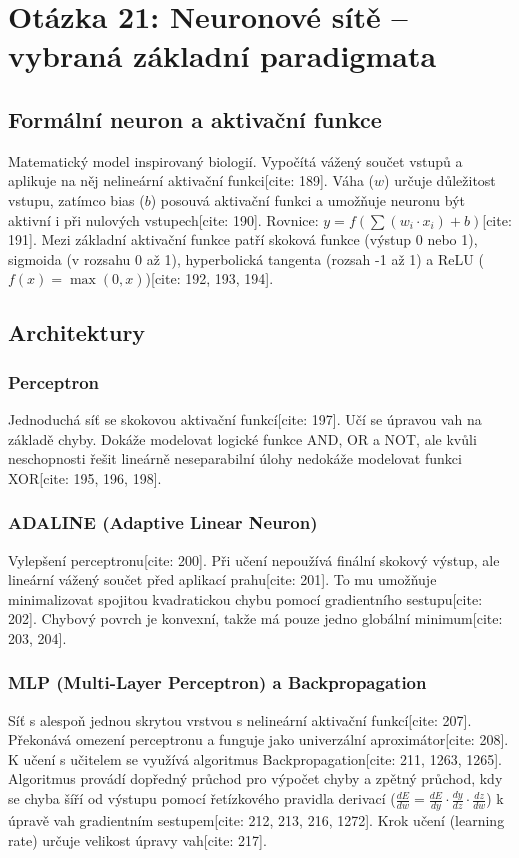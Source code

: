 \documentclass{article}
\begin{document}
\newpage

\section{Otázka 21: Neuronové sítě – vybraná základní paradigmata}

\subsection{Formální neuron a aktivační funkce}
Matematický model inspirovaný biologií. Vypočítá vážený součet vstupů a aplikuje na něj nelineární aktivační funkci[cite: 189]. Váha ($w$) určuje důležitost vstupu, zatímco bias ($b$) posouvá aktivační funkci a umožňuje neuronu být aktivní i při nulových vstupech[cite: 190]. Rovnice: $y = f(\sum(w_i \cdot x_i) + b)$[cite: 191].
Mezi základní aktivační funkce patří skoková funkce (výstup 0 nebo 1), sigmoida (v rozsahu 0 až 1), hyperbolická tangenta (rozsah -1 až 1) a ReLU ($f(x) = \max(0, x)$)[cite: 192, 193, 194].

\subsection{Architektury}
\subsubsection{Perceptron}
Jednoduchá síť se skokovou aktivační funkcí[cite: 197]. Učí se úpravou vah na základě chyby. Dokáže modelovat logické funkce AND, OR a NOT, ale kvůli neschopnosti řešit lineárně neseparabilní úlohy nedokáže modelovat funkci XOR[cite: 195, 196, 198].

\subsubsection{ADALINE (Adaptive Linear Neuron)}
Vylepšení perceptronu[cite: 200]. Při učení nepoužívá finální skokový výstup, ale lineární vážený součet před aplikací prahu[cite: 201]. To mu umožňuje minimalizovat spojitou kvadratickou chybu pomocí gradientního sestupu[cite: 202]. Chybový povrch je konvexní, takže má pouze jedno globální minimum[cite: 203, 204].

\subsubsection{MLP (Multi-Layer Perceptron) a Backpropagation}
Síť s alespoň jednou skrytou vrstvou s nelineární aktivační funkcí[cite: 207]. Překonává omezení perceptronu a funguje jako univerzální aproximátor[cite: 208]. K učení s učitelem se využívá algoritmus Backpropagation[cite: 211, 1263, 1265]. Algoritmus provádí dopředný průchod pro výpočet chyby a zpětný průchod, kdy se chyba šíří od výstupu pomocí řetízkového pravidla derivací ($\frac{dE}{dw} = \frac{dE}{dy} \cdot \frac{dy}{dz} \cdot \frac{dz}{dw}$) k úpravě vah gradientním sestupem[cite: 212, 213, 216, 1272]. Krok učení (learning rate) určuje velikost úpravy vah[cite: 217].
\end{document}
